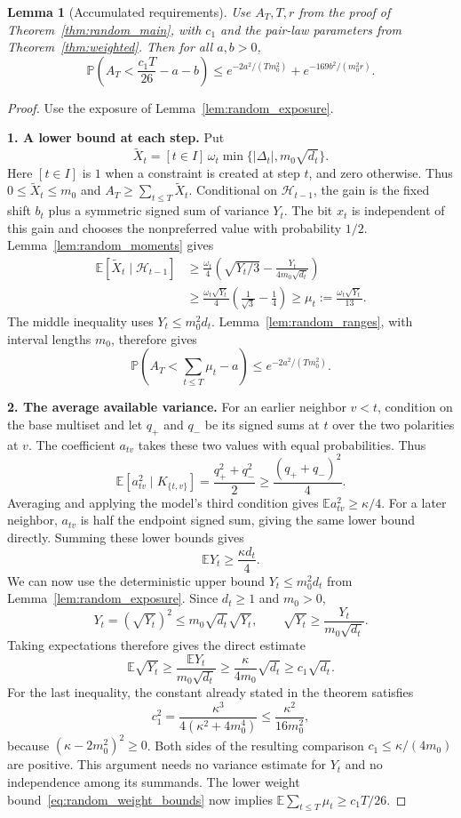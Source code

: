 \documentclass[11pt,a4paper]{article}
\newtheorem{lemma}[theorem]{Lemma}
\theoremstyle{definition}
\theoremstyle{remark}
\newcommand{\E}{\mathbb E}
\newcommand{\Prb}{\mathbb P}
\begin{document}
\begin{lemma}[Accumulated requirements]\label{lem:random_requirements}
Use $A_T,T,r$ from the proof of Theorem~\ref{thm:random_main}, with
$c_1$ and the pair-law parameters from Theorem~\ref{thm:weighted}. Then
for all $a,b>0$,
\[
 \Prb\left(A_T<\frac{c_1T}{26}-a-b\right)
 \le e^{-2a^2/(Tm_0^2)}+e^{-169b^2/(m_0^2r)}.
\]
\end{lemma}
\begin{proof}
Use the exposure of Lemma~\ref{lem:random_exposure}.

\par\medskip\noindent\textbf{1. A lower bound at each step.}
Put
\[
 \widetilde X_t=[t\in I]\,\omega_t
            \min\{|\Delta_t|,m_0\sqrt{d_t}\}.
\]
Here $[t\in I]$ is $1$ when a constraint is created at step $t$,
and zero otherwise. Thus $0\le\widetilde X_t\le m_0$ and
$A_T\ge\sum_{t\le T}\widetilde X_t$.
Conditional on $\mathcal H_{t-1}$, the gain is the fixed shift $b_t$
plus a symmetric signed sum of variance $Y_t$.
The bit $x_t$ is independent of this gain and chooses the nonpreferred
value with probability $1/2$. Lemma~\ref{lem:random_moments} gives
\begin{align*}
 \E[\widetilde X_t\mid\mathcal H_{t-1}]
 &\ge\frac{\omega_t}{4}
       \left(\sqrt{Y_t/3}-\frac{Y_t}{4m_0\sqrt{d_t}}\right)\\
 &\ge\frac{\omega_t\sqrt{Y_t}}4
             \left(\frac1{\sqrt3}-\frac14\right)
 \ge \mu_t:=\frac{\omega_t\sqrt{Y_t}}{13}.
\end{align*}
The middle inequality uses $Y_t\le m_0^2d_t$.
Lemma~\ref{lem:random_ranges}, with interval lengths $m_0$, therefore gives
\[
 \Prb\left(A_T<\sum_{t\le T}\mu_t-a\right)
 \le e^{-2a^2/(Tm_0^2)}.
\]

\par\medskip\noindent\textbf{2. The average available variance.}
For an earlier neighbor $v<t$, condition on the base multiset and let
$q_+$ and $q_-$ be its signed sums at $t$ over the two polarities at $v$.
The coefficient $a_{tv}$ takes these two values with equal probabilities.
Thus
\[
 \E[a_{tv}^2\mid K_{\{t,v\}}]
 =\frac{q_+^2+q_-^2}{2}
 \ge\frac{(q_++q_-)^2}{4}.
\]
Averaging and applying the model's third condition gives
$\E a_{tv}^2\ge\kappa/4$. For a later neighbor, $a_{tv}$ is half
the endpoint signed sum, giving the same lower bound directly.
Summing these lower bounds gives
\[
 \E Y_t\ge\frac{\kappa d_t}{4}.
\]
We can now use the deterministic upper bound $Y_t\le m_0^2d_t$
from Lemma~\ref{lem:random_exposure}. Since $d_t\ge1$ and $m_0>0$,
\[
 Y_t=(\sqrt{Y_t})^2\le m_0\sqrt{d_t}\sqrt{Y_t},
 \qquad
 \sqrt{Y_t}\ge\frac{Y_t}{m_0\sqrt{d_t}}.
\]
Taking expectations therefore gives the direct estimate
\[
 \E\sqrt{Y_t}\ge\frac{\E Y_t}{m_0\sqrt{d_t}}
       \ge\frac{\kappa}{4m_0}\sqrt{d_t}
       \ge c_1\sqrt{d_t}.
\]
For the last inequality, the constant already stated in the theorem
satisfies
\[
 c_1^2=\frac{\kappa^3}{4(\kappa^2+4m_0^4)}
       \le\frac{\kappa^2}{16m_0^2},
\]
because $(\kappa-2m_0^2)^2\ge0$. Both sides of the resulting comparison
$c_1\le\kappa/(4m_0)$ are positive. This argument needs no variance
estimate for $Y_t$ and no independence among its summands.
The lower weight bound~\eqref{eq:random_weight_bounds} now implies
$\E\sum_{t\le T}\mu_t\ge c_1T/26$.


\end{proof}
\end{document}
